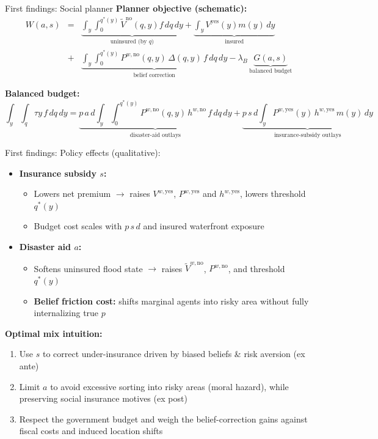 \documentclass[xcolor=dvipsnames, aspectratio = 169]{beamer}
\begin{document}
{
\begin{frame}{First findings: Social planner}
\small
\textbf{Planner objective (schematic):}
\begin{eqnarray*}
    W(a,s)&=&
\underbrace{\int_y \int_0^{q^*(y)} \tilde V^{\text{no}}(q,y) f\,dq\,dy}_{\text{uninsured (by $q$)}}
+\underbrace{\int_y V^{\text{yes}}(y) m(y)\,dy}_{\text{insured}} \\
&+&\underbrace{\int_y \int_0^{q^*(y)} P^{w,\text{no}}(q,y)\,\Delta(q,y)\, f\,dq\,dy}_{\text{belief correction}}
-\lambda_B\, \underbrace{G(a,s)}_{\text{balanced budget}} 
\end{eqnarray*}


\textbf{Balanced budget:}
\[
\int_y\!\!\int_q \tau y\, f\,dq\,dy
=
\underbrace{p\,a\,d\!\int_y\!\!\int_0^{q^*(y)} \! P^{w,\text{no}}(q,y)\,h^{w,\text{no}}\, f\,dq\,dy}_{\text{disaster-aid outlays}}
+
\underbrace{p\,s\,d\!\int_y \! P^{w,\text{yes}}(y)\,h^{w,\text{yes}}\, m(y)\,dy}_{\text{insurance-subsidy outlays}}
\]
\end{frame}


\begin{frame}{First findings: Policy effects (qualitative):}
\small
\begin{itemize}[leftmargin=-0.2cm]
  \item \textbf{Insurance subsidy $s$:}
  \begin{itemize}
    \item Lowers net premium $\rightarrow$ raises $V^{w,\text{yes}}$, $P^{w,\text{yes}}$ and $h^{w,\text{yes}}$, lowers threshold $q^*(y)$
    \item Budget cost scales with $p\,s\,d$ and insured waterfront exposure
  \end{itemize}
  \item \textbf{Disaster aid $a$:}
  \begin{itemize}
    \item Softens uninsured flood state $\rightarrow$ raises $\tilde V^{w,\text{no}}$, $P^{w,\text{no}}$, and threshold $q^*(y)$ 
    \item \textbf{Belief friction cost:} shifts marginal agents into risky area without fully internalizing true $p$
  \end{itemize}
\end{itemize}
\smallskip
\textbf{Optimal mix intuition:}
\begin{enumerate}[label=\arabic*.] 
  \item Use $s$ to correct under-insurance driven by biased beliefs \& risk aversion (ex ante)
  \item Limit $a$ to avoid excessive sorting into risky areas (moral hazard), while preserving social insurance motives (ex post)
  \item Respect the government budget and weigh the belief-correction gains against fiscal costs and induced location shifts
\end{enumerate}
\end{frame}

}
\end{document}
